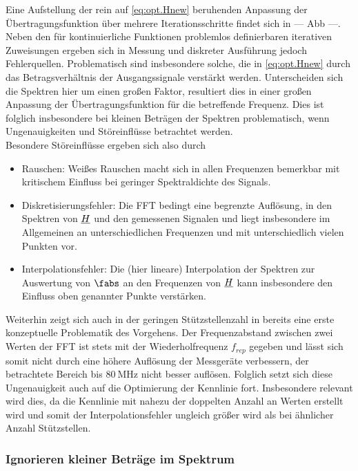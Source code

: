 \documentclass[../Report.tex]{subfiles}
\begin{document}
Eine Aufstellung der rein auf \eqref{eq:opt.Hnew} beruhenden Anpassung der Übertragungsfunktion über mehrere Iterationsschritte findet sich in --- Abb ---. 
Neben den für kontinuierliche Funktionen problemlos definierbaren iterativen Zuweisungen ergeben sich in Messung und diskreter Ausführung jedoch Fehlerquellen. Problematisch sind insbesondere solche, die in \eqref{eq:opt.Hnew} durch das Betragsverhältnis der Ausgangssignale verstärkt werden. 
Unterscheiden sich die Spektren hier um einen großen Faktor, resultiert dies in einer großen Anpassung der Übertragungsfunktion für die betreffende Frequenz. Dies ist folglich insbesondere bei kleinen Beträgen der Spektren problematisch, wenn Ungenauigkeiten und Störeinflüsse betrachtet werden. 
\\
Besondere Störeinflüsse ergeben sich also durch
\begin{itemize}
	\item Rauschen: Weißes Rauschen macht sich in allen Frequenzen bemerkbar mit kritischem Einfluss bei geringer Spektraldichte des Signals.
	
	\item Diskretisierungsfehler: Die FFT bedingt eine begrenzte Auflösung, in den Spektren von $\underline{H}$ und den gemessenen Signalen und liegt insbesondere im Allgemeinen an unterschiedlichen Frequenzen und mit unterschiedlich vielen Punkten vor.
	
	\item Interpolationsfehler: Die (hier lineare) Interpolation der Spektren zur Auswertung von $\fabs$ an den Frequenzen von $\underline{H}$ kann insbesondere den Einfluss oben genannter Punkte verstärken.
\end{itemize}

Weiterhin zeigt sich auch in der geringen Stützstellenzahl in  bereits eine erste konzeptuelle Problematik des Vorgehens. Der Frequenzabstand zwischen zwei Werten der FFT ist stets mit der Wiederholfrequenz $f_{rep}$ gegeben und lässt sich somit nicht durch eine höhere Auflösung der Messgeräte verbessern, der betrachtete Bereich bis $\SI{80}{\MHz}$ nicht besser auflösen.
Folglich setzt sich diese Ungenauigkeit auch auf die Optimierung der Kennlinie fort. Insbesondere relevant wird dies, da die Kennlinie mit nahezu der doppelten Anzahl an Werten erstellt wird und somit der Interpolationsfehler ungleich größer wird als bei ähnlicher Anzahl Stützstellen.


\subsubsection*{Ignorieren kleiner Beträge im Spektrum}
\label{subsubsec:opt.H.prom}
\end{document}
